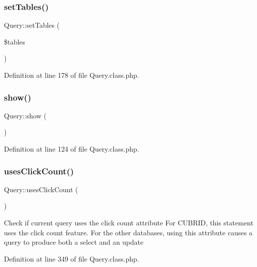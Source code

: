 \mbox{\label{classQuery_a883baff577719a7108a3acc202d2db00}} 
\subsubsection{\texorpdfstring{set\+Tables()}{setTables()}}
{\footnotesize\ttfamily Query\+::set\+Tables (\begin{DoxyParamCaption}\item[{}]{\$tables }\end{DoxyParamCaption})}



Definition at line 178 of file Query.\+class.\+php.

\mbox{\label{classQuery_ab191941325776f3475aeea910167a116}} 
\subsubsection{\texorpdfstring{show()}{show()}}
{\footnotesize\ttfamily Query\+::show (\begin{DoxyParamCaption}{ }\end{DoxyParamCaption})}



Definition at line 124 of file Query.\+class.\+php.

\mbox{\label{classQuery_ab0f5afff51d19f0f5478055dcb16c2c0}} 
\subsubsection{\texorpdfstring{uses\+Click\+Count()}{usesClickCount()}}
{\footnotesize\ttfamily Query\+::uses\+Click\+Count (\begin{DoxyParamCaption}{ }\end{DoxyParamCaption})}

Check if current query uses the click count attribute For C\+U\+B\+R\+ID, this statement uses the click count feature. For the other databases, using this attribute causes a query to produce both a select and an update 

Definition at line 349 of file Query.\+class.\+php.

